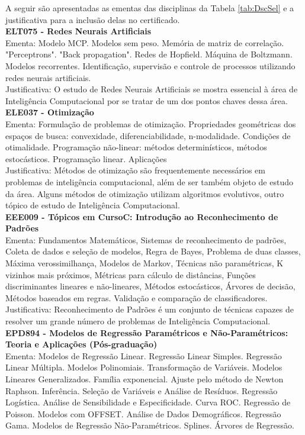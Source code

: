 \documentclass{article}
\newcommand{\curso}{Curso} %
\begin{document}
	A seguir são apresentadas as ementas das disciplinas da Tabela \ref{tab:DscSel} e a justificativa para a inclusão delas no certificado. \\
	\textbf{ELT075 - Redes Neurais Artificiais} \\
	Ementa: Modelo MCP. Modelos sem peso. Memória de matriz de correlação. "Perceptrons". "Back propagation". Redes de Hopfield. Máquina de Boltzmann. Modelos recorrentes. Identificação, supervisão e controle de processos utilizando redes neurais artificiais. \\
	Justificativa: O estudo de Redes Neurais Artificiais se mostra essencial à área de Inteligência Computacional por se tratar de um dos pontos chaves dessa área. \\
	\textbf{ELE037 - Otimização}\\
	Ementa: Formulação de problemas de otimização. Propriedades geométricas dos espaços de busca: convexidade, diferenciabilidade, n-modalidade. Condições de otimalidade. Programação não-linear: métodos determinísticos, métodos estocásticos. Programação linear. Aplicações \\
	Justificativa: Métodos de otimização são frequentemente necessários em problemas de inteligência computacional, além de ser também objeto de estudo da área. Alguns métodos de otimização utilizam algoritmos evolutivos, outro tópico de estudo de Inteligência Computacional.  \\
	\textbf{EEE009 - Tópicos em \curso C: Introdução ao Reconhecimento de Padrões} \\
	Ementa: Fundamentos Matemáticos, Sistemas de reconhecimento de padrões, Coleta de dados e seleção de modelos, Regra de Bayes, Problema de duas classes, Máxima verossimilhança, Modelos de Markov, Técnicas não paramétricas, K vizinhos mais próximos, Métricas para cálculo de distâncias, Funções discriminantes lineares e não-lineares, Métodos estocásticos, Árvores de decisão, Métodos baseados em regras. Validação e comparação de classificadores. \\
	Justificativa: Reconhecimento de Padrões é um conjunto de técnicas capazes de resolver um grande número de problemas de Inteligência Computacional. \\
	\textbf{EPD894 - Modelos de Regressão Paramétricos e Não-Paramétricos: Teoria e Aplicações (Pós-graduação)} \\
	Ementa: Modelos de Regressão Linear. Regressão Linear Simples. Regressão Linear Múltipla. Modelos Polinomiais. Transformação de Variáveis. Modelos Lineares Generalizados. Família exponencial. Ajuste pelo método de Newton Raphson. Inferência. Seleção de Variáveis e Análise de Resíduos. Regressão Logística. Análise de Sensibilidade e Especificidade. Curva ROC. Regressão de Poisson. Modelos com OFFSET. Análise de Dados Demográficos. Regressão Gama. Modelos de Regressão Não-Paramétricos. Splines. Árvores de Regressão. \\
\end{document}
